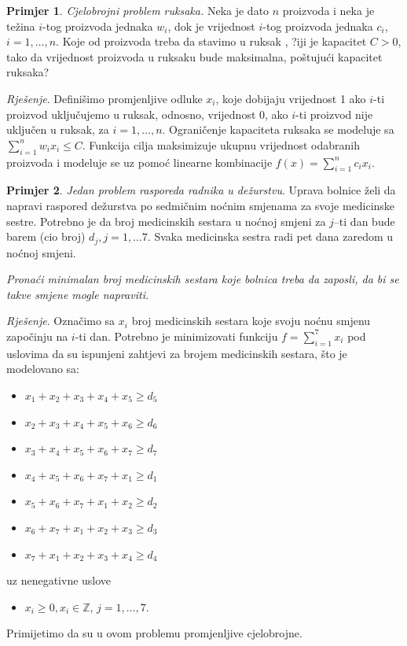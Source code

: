 \documentclass[a4paper, utf8, 11pt, colorlinks]{book}
\theoremstyle{definition}
\newtheorem{primjer}{Primjer}[chapter]
\begin{document}
\begin{primjer}
\emph{Cjelobrojni problem ruksaka.} Neka je dato $n$ proizvoda i neka je težina $i$-tog proizvoda jednaka $w_i$, dok je vrijednost $i$-tog proizvoda jednaka $c_i$, $i=1,\ldots,n$. Koje od proizvoda treba da stavimo u ruksak , ?iji je kapacitet $C>0$, tako da   vrijednost proizvoda u ruksaku bude maksimalna, poštujući  kapacitet  ruksaka? 

\emph{Rješenje}. Definišimo promjenljive odluke $x_i$, koje dobijaju vrijednost 1 ako  $i$-ti proizvod uključujemo u ruksak, odnosno, vrijednost 0, ako $i$-ti proizvod nije uključen u ruksak, za $i=1,\ldots,n$. Ograničenje kapaciteta ruksaka se modeluje sa $\sum_{i=1}^n w_i x_i \leq C$. Funkcija cilja maksimizuje ukupnu vrijednost odabranih proizvoda i modeluje se uz pomoć linearne kombinacije $f(x) = \sum_{i=1}^n c_i x_i$. 
\end{primjer}
\begin{primjer}
\emph{Jedan problem rasporeda radnika u dežurstvu}. Uprava bolnice želi da napravi raspored dežurstva po sedmičnim noćnim smjenama za svoje medicinske sestre.  Potrebno je da broj medicinskih sestara u noćnoj smjeni za $j$--ti dan bude barem (cio broj) $d_j, j = 1,\ldots 7$. Svaka
medicinska sestra radi pet dana zaredom u noćnoj smjeni. 

\emph{Pronaći minimalan broj medicinskih sestara koje bolnica treba da zaposli, da bi se takve smjene mogle napraviti.}

\emph{Rješenje}. Označimo sa $x_i$ broj medicinskih sestara koje svoju noćnu smjenu započinju na $i$-ti dan. Potrebno je minimizovati funkciju 
$f = \sum_{i=1}^7 x_i$ pod uslovima da su ispunjeni zahtjevi za brojem medicinskih sestara, što je modelovano sa:
\begin{itemize}
	\item $x_1 + x_2 + x_3 + x_4 + x_5 \geq d_5 $
	\item $x_2 + x_3 + x_4 + x_5 + x_6 \geq d_6$
	\item $x_3 + x_4 + x_5 + x_6 + x_7 \geq d_7$
	\item $x_4 + x_5 + x_6 + x_7 + x_1 \geq d_1 $
	\item $x_5 + x_6 + x_7 + x_1 + x_2   \geq d_2$
	\item $x_6 + x_7 + x_1 + x_2 + x_3  \geq d_3$
	\item $  x_7 + x_1 + x_2 + x_3 + x_4 \geq d_4$
\end{itemize}
uz nenegativne uslove 
\begin{itemize}
	\item $x_i \geq 0, x_i \in \mathbb{Z}$, $j=1,\ldots,7.$
\end{itemize}
Primijetimo da su u ovom problemu promjenljive  cjelobrojne. %
\end{primjer}
\end{document}
